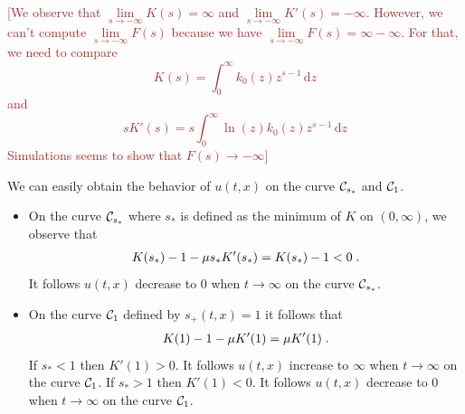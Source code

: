 \documentclass[11pt]{amsart}
\newcommand{\diff}{\,\mathrm{d}}
\newcommand{\ndr}[1]{\textcolor{brown}{[#1]}}
\begin{document}
    \ndr{We observe that $\lim\limits_{s\to -\infty}K(s) = \infty$ and $\lim\limits_{s\to-\infty} K'(s) = -\infty$. However, we can't compute $\lim\limits_{s\to -\infty}F(s)$ because we have $\lim\limits_{s\to -\infty}F(s) = \infty - \infty$. For that, we need to compare $$K(s) = \int_0^\infty k_0(z)z^{s-1} \diff z$$ and $$sK'(s) = s \int_0^\infty \ln(z)k_0(z)z^{s-1} \diff z$$ Simulations seems to show that $F(s) \to -\infty$}

        

    \begin{remark}We can easily obtain the behavior of $u(t,x)$ on the curve $\mathcal{C}_{s_*}$ and $\mathcal{C}_1$.
    \begin{itemize}
        \item On the curve $\mathcal{C}_{s_*}$ where $s_*$ is defined as the minimum of $K$ on $(0, \infty)$, we observe that 
        \begin{align*}
            K(s_*)-1 -  \mu s_* K'(s_*) = K(s_*)-1 < 0
            \; .
        \end{align*}
        It follows $u(t, x)$ decrease to $0$ when $t \to \infty$ on the curve $\mathcal{C}_{s_*}$. 
        \item On the curve $\mathcal{C}_{1}$ defined by $s_+(t, x) = 1$ it follows that 
        \begin{align*}
            K(1)-1 -  \mu K'(1) = \mu K'(1)
            \; .
        \end{align*}
        If $s_* < 1$ then $K'(1) > 0$. 
        It follows $u(t, x)$ increase to $\infty$ when $t \to \infty$ on the curve $\mathcal{C}_{1}$.  If $s_* > 1$ then $K'(1) < 0$. 
        It follows $u(t, x)$ decrease to $0$ when $t \to \infty$ on the curve $\mathcal{C}_{1}$. 
    \end{itemize}
    \end{remark}
\end{document}
